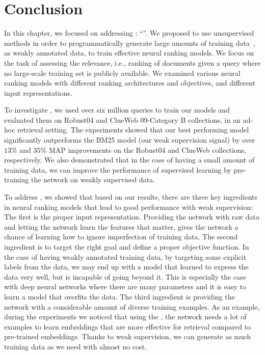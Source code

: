 \section{Conclusion}
In this chapter, we focused on addressing \textbf{}: ``\emph{}''. 
We proposed to use unsupervised methods in order to programmatically generate large amounts of training data~\citep{Ratner:2016}, as weakly annotated data, to train effective neural ranking models. We focus on the task of assessing the relevance, i.e., ranking of documents given a query where no large-scale training set is publicly available. We examined various neural ranking models with different ranking architectures and objectives, and different input representations. 

To investigate \textbf{}, we used over six million queries to train our models and evaluated them on Robust04 and ClueWeb 09-Category B collections, in an ad-hoc retrieval setting.  The experiments showed that our best performing model significantly outperforms the BM25 model (our weak supervision signal) by over $13\%$ and $35\%$ MAP improvements on the Robust04 and ClueWeb collections, respectively. 
We also demonstrated that in the case of having a small amount of training data, we can improve the performance of supervised learning by pre-training the network on weakly supervised data.

To address \textbf{}, we showed that based on our results, there are three key ingredients in neural ranking models that lead to good performance with weak supervision:
%
The first is the proper input representation. Providing the network with raw data and letting the network learn the features that matter, gives the network a chance of learning how to ignore imperfection of training data.
%
The second ingredient is to target the right goal and define a proper objective function. In the case of having weakly annotated training data, by targeting some explicit labels from the data, we may end up with a model that learned to express the data very well, but is incapable of going beyond it. 
This is especially the case with deep neural networks where there are many parameters and it is easy to learn a model that overfits the data.
%
The third ingredient is providing the network with a considerable amount of diverse training examples. 
As an example, during the experiments we noticed that using the \feedthree, the network needs a lot of examples to learn embeddings that are more effective for retrieval compared to pre-trained embeddings. 
Thanks to weak supervision, we can generate as much training data as we need with almost no cost.

